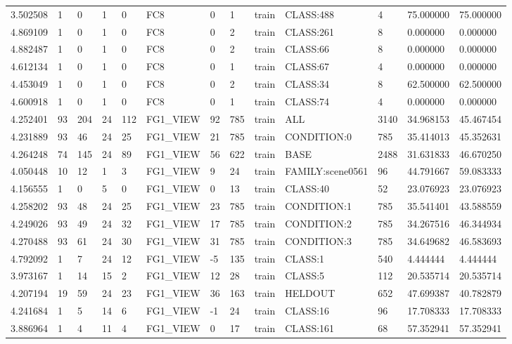 \begin{tabular}{lllllllllllll}
3.502508 & 1 & 0 & 1 & 0 & FC8 & 0 & 1 & train & CLASS:488 & 4 & 75.000000 & 75.000000 \\
4.869109 & 1 & 0 & 1 & 0 & FC8 & 0 & 2 & train & CLASS:261 & 8 & 0.000000 & 0.000000 \\
4.882487 & 1 & 0 & 1 & 0 & FC8 & 0 & 2 & train & CLASS:66 & 8 & 0.000000 & 0.000000 \\
4.612134 & 1 & 0 & 1 & 0 & FC8 & 0 & 1 & train & CLASS:67 & 4 & 0.000000 & 0.000000 \\
4.453049 & 1 & 0 & 1 & 0 & FC8 & 0 & 2 & train & CLASS:34 & 8 & 62.500000 & 62.500000 \\
4.600918 & 1 & 0 & 1 & 0 & FC8 & 0 & 1 & train & CLASS:74 & 4 & 0.000000 & 0.000000 \\
4.252401 & 93 & 204 & 24 & 112 & FG1\_VIEW & 92 & 785 & train & ALL & 3140 & 34.968153 & 45.467454 \\
4.231889 & 93 & 46 & 24 & 25 & FG1\_VIEW & 21 & 785 & train & CONDITION:0 & 785 & 35.414013 & 45.352631 \\
4.264248 & 74 & 145 & 24 & 89 & FG1\_VIEW & 56 & 622 & train & BASE & 2488 & 31.631833 & 46.670250 \\
4.050448 & 10 & 12 & 1 & 3 & FG1\_VIEW & 9 & 24 & train & FAMILY:scene0561 & 96 & 44.791667 & 59.083333 \\
4.156555 & 1 & 0 & 5 & 0 & FG1\_VIEW & 0 & 13 & train & CLASS:40 & 52 & 23.076923 & 23.076923 \\
4.258202 & 93 & 48 & 24 & 25 & FG1\_VIEW & 23 & 785 & train & CONDITION:1 & 785 & 35.541401 & 43.588559 \\
4.249026 & 93 & 49 & 24 & 32 & FG1\_VIEW & 17 & 785 & train & CONDITION:2 & 785 & 34.267516 & 46.344934 \\
4.270488 & 93 & 61 & 24 & 30 & FG1\_VIEW & 31 & 785 & train & CONDITION:3 & 785 & 34.649682 & 46.583693 \\
4.792092 & 1 & 7 & 24 & 12 & FG1\_VIEW & -5 & 135 & train & CLASS:1 & 540 & 4.444444 & 4.444444 \\
3.973167 & 1 & 14 & 15 & 2 & FG1\_VIEW & 12 & 28 & train & CLASS:5 & 112 & 20.535714 & 20.535714 \\
4.207194 & 19 & 59 & 24 & 23 & FG1\_VIEW & 36 & 163 & train & HELDOUT & 652 & 47.699387 & 40.782879 \\
4.241684 & 1 & 5 & 14 & 6 & FG1\_VIEW & -1 & 24 & train & CLASS:16 & 96 & 17.708333 & 17.708333 \\
3.886964 & 1 & 4 & 11 & 4 & FG1\_VIEW & 0 & 17 & train & CLASS:161 & 68 & 57.352941 & 57.352941 \\

\end{tabular}

